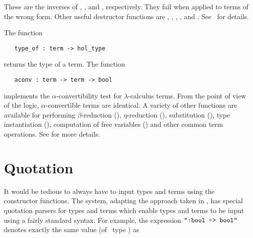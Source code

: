 These are the inverses of , ,
 and , respectively. They fail when applied
to terms of the wrong form. Other useful destructor functions are
,
,
,
,
 and
.
See \REFERENCE\ for details.

The function

\begin{holboxed}
\begin{verbatim}
   type_of : term -> hol_type
\end{verbatim}
\end{holboxed}

\noindent returns the type
of a term. The function

\begin{holboxed}
\begin{verbatim}
   aconv : term -> term -> bool
\end{verbatim}
\end{holboxed}

\noindent implements the $\alpha$-convertibility test for
$\lambda$-calculus terms.
%
%
From the point of view of the \HOL{} logic, $\alpha$-convertible terms
are identical. A variety of other functions are available for
performing $\beta$-reduction (), $\eta$-reduction
(), substitution (), type instantiation (), computation of free variables () and
other common term operations.  See \REFERENCE{} for more details.


\section{Quotation}
\label{quotation}\label{gen-abs}\label{let}

It would be tedious to always have to input types and terms
using the constructor functions. The \HOL{} system, adapting the
approach taken in \LCF{}, has special
quotation
parsers for \HOL{} types and terms which enable types and terms
to be input using a fairly standard syntax. For example, the \ML{}
expression $\holquote{\ml{:bool -> bool}}$ denotes exactly the same
value (of \ML\ type ) as

